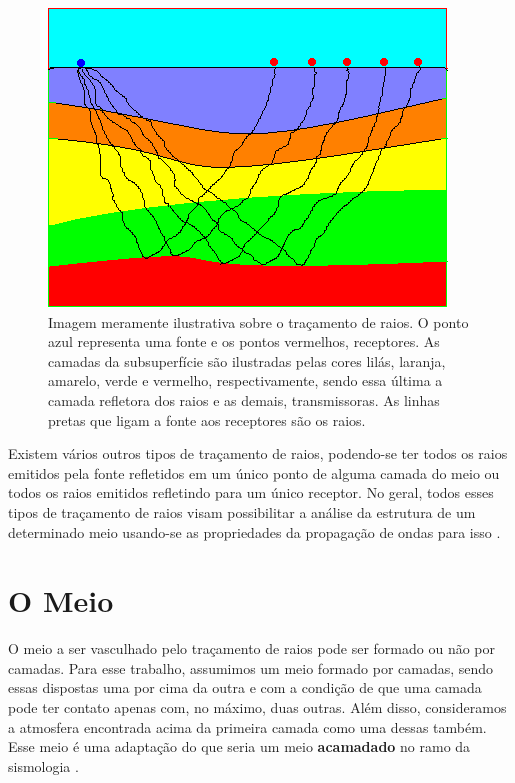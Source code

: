         \begin{figure}[H]
            \centering
            \includegraphics[scale=.8]{imagens/ilustracoes/rayTracing.png}
            
            \hrulefill
            \caption{Imagem meramente ilustrativa sobre o traçamento de raios. O ponto azul representa uma fonte e os pontos vermelhos, receptores. As camadas da subsuperfície são ilustradas pelas cores lilás, laranja, amarelo, verde e vermelho, respectivamente, sendo essa última a camada refletora dos raios e as demais, transmissoras. As linhas pretas que ligam a fonte aos receptores são os raios.}
            \hrulefill
            \label{fig:rayTracing}
        \end{figure}
        
        Existem vários outros tipos de traçamento de raios, podendo-se ter todos os raios emitidos pela fonte refletidos em um único ponto de alguma camada do meio ou todos os raios emitidos refletindo para um único receptor. No geral, todos esses tipos de traçamento de raios visam possibilitar a análise da estrutura de um determinado meio usando-se as propriedades da propagação de ondas para isso \cite{notasAulas2017}.
    
    \section{O Meio}
    
        O meio a ser vasculhado pelo traçamento de raios pode ser formado ou não por camadas. Para esse trabalho, assumimos um meio formado por camadas, sendo essas dispostas uma por cima da outra e com a condição de que uma camada pode ter contato apenas com, no máximo, duas outras. Além disso, consideramos a atmosfera encontrada acima da primeira camada como uma dessas também. Esse meio é uma adaptação do que seria um meio \textbf{acamadado} no ramo da sismologia \cite{notasAulas2017}.
        
